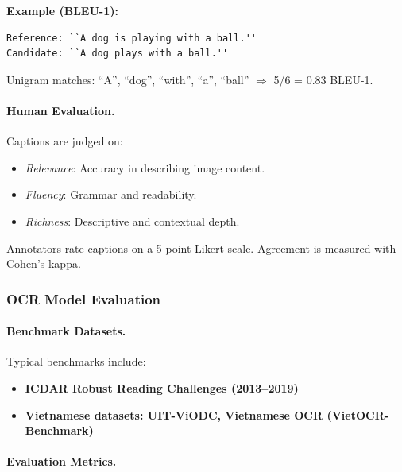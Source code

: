 \documentclass[conference]{IEEEtran}
\begin{document}
\noindent\textbf{Example (BLEU-1):}
{\small
	\begin{verbatim}
Reference: ``A dog is playing with a ball.''
Candidate: ``A dog plays with a ball.''
	\end{verbatim}
}
Unigram matches: ``A'', ``dog'', ``with'', ``a'', ``ball'' $\Rightarrow$ 5/6 = 0.83 BLEU-1.

\paragraph{Human Evaluation.} Captions are judged on:

\begin{itemize}
	\item \textit{Relevance}: Accuracy in describing image content.
	\item \textit{Fluency}: Grammar and readability.
	\item \textit{Richness}: Descriptive and contextual depth.
\end{itemize}

Annotators rate captions on a 5-point Likert scale. Agreement is measured with Cohen’s kappa.

\subsubsection{OCR Model Evaluation}

\paragraph{Benchmark Datasets.} Typical benchmarks include:

\begin{itemize}
	\item \textbf{ICDAR Robust Reading Challenges (2013–2019)}
	\item \textbf{Vietnamese datasets: UIT-ViODC, Vietnamese OCR (VietOCR-Benchmark)}
\end{itemize}

\paragraph{Evaluation Metrics.}
\end{document}
